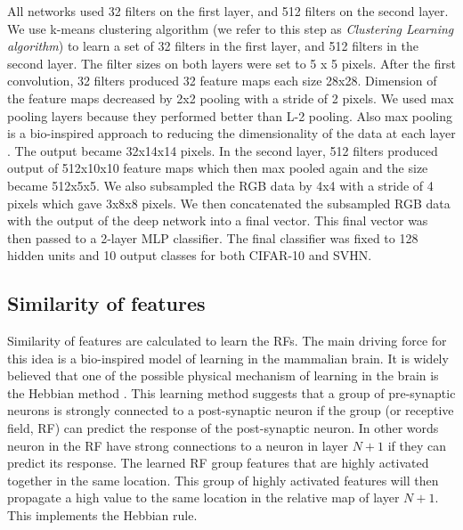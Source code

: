 \documentclass{article} %
\begin{document}
All networks used 32 filters on the first layer, and 512 filters on the second layer. We use k-means clustering algorithm (we refer to this step as \textit{Clustering Learning algorithm}) to learn a set of 32 filters in the first layer, and 512 filters in the second layer. The filter sizes on both layers were set to 5 x 5 pixels.  After the first convolution, 32 filters produced 32 feature maps each size 28x28. Dimension of the feature maps decreased by 2x2 pooling with a stride of 2 pixels. We used max pooling layers because they performed better than L-2 pooling. Also max pooling is a bio-inspired approach to reducing the dimensionality of the data at each layer \cite{lampl2004intracellular}. The output became 32x14x14 pixels. In the second layer, 512 filters produced output of 512x10x10 feature maps which then max pooled again and the size became 512x5x5. 
We also subsampled the RGB data by 4x4 with a stride of 4 pixels which gave 3x8x8 pixels.  We then concatenated the subsampled RGB data with the output of the deep network into a final vector. This final vector was then passed to a 2-layer MLP classifier. The final classifier was fixed to 128 hidden units and 10 output classes for both CIFAR-10 and SVHN.






\subsection{Similarity of features}
\label{sec-similarity}
Similarity of features are calculated to learn the RFs. The main driving force for this idea is a bio-inspired model of learning in the mammalian brain. It is widely believed that one of the possible physical mechanism of learning in the brain is the Hebbian method \cite{masquelier2007learning}. This learning method suggests that a group of pre-synaptic neurons is strongly connected to a post-synaptic neuron if the group (or receptive field, RF) can predict the response of the post-synaptic neuron. In other words neuron in the RF have strong connections to a neuron in layer $N+1$ if they can predict its response. The learned RF group features that are highly activated together in the same location. This group of highly activated features will then propagate a high value to the same location in the relative map of layer $N+1$. This implements the Hebbian rule. 
\end{document}
